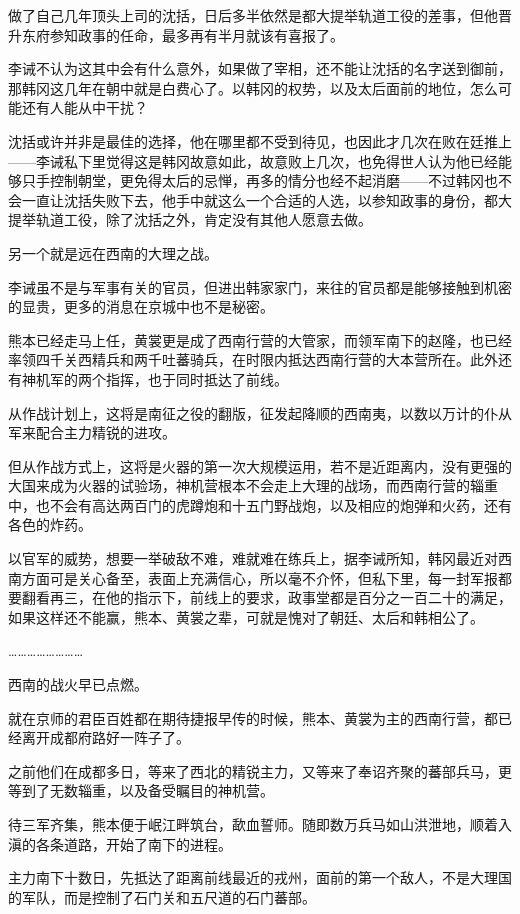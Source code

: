 做了自己几年顶头上司的沈括，日后多半依然是都大提举轨道工役的差事，但他晋升东府参知政事的任命，最多再有半月就该有喜报了。

李诫不认为这其中会有什么意外，如果做了宰相，还不能让沈括的名字送到御前，那韩冈这几年在朝中就是白费心了。以韩冈的权势，以及太后面前的地位，怎么可能还有人能从中干扰？

沈括或许并非是最佳的选择，他在哪里都不受到待见，也因此才几次在败在廷推上——李诫私下里觉得这是韩冈故意如此，故意败上几次，也免得世人认为他已经能够只手控制朝堂，更免得太后的忌惮，再多的情分也经不起消磨——不过韩冈也不会一直让沈括失败下去，他手中就这么一个合适的人选，以参知政事的身份，都大提举轨道工役，除了沈括之外，肯定没有其他人愿意去做。

另一个就是远在西南的大理之战。

李诫虽不是与军事有关的官员，但进出韩家家门，来往的官员都是能够接触到机密的显贵，更多的消息在京城中也不是秘密。

熊本已经走马上任，黄裳更是成了西南行营的大管家，而领军南下的赵隆，也已经率领四千关西精兵和两千吐蕃骑兵，在时限内抵达西南行营的大本营所在。此外还有神机军的两个指挥，也于同时抵达了前线。

从作战计划上，这将是南征之役的翻版，征发起降顺的西南夷，以数以万计的仆从军来配合主力精锐的进攻。

但从作战方式上，这将是火器的第一次大规模运用，若不是近距离内，没有更强的大国来成为火器的试验场，神机营根本不会走上大理的战场，而西南行营的辎重中，也不会有高达两百门的虎蹲炮和十五门野战炮，以及相应的炮弹和火药，还有各色的炸药。

以官军的威势，想要一举破敌不难，难就难在练兵上，据李诫所知，韩冈最近对西南方面可是关心备至，表面上充满信心，所以毫不介怀，但私下里，每一封军报都要翻看再三，在他的指示下，前线上的要求，政事堂都是百分之一百二十的满足，如果这样还不能赢，熊本、黄裳之辈，可就是愧对了朝廷、太后和韩相公了。

……………………

西南的战火早已点燃。

就在京师的君臣百姓都在期待捷报早传的时候，熊本、黄裳为主的西南行营，都已经离开成都府路好一阵子了。

之前他们在成都多日，等来了西北的精锐主力，又等来了奉诏齐聚的蕃部兵马，更等到了无数辎重，以及备受瞩目的神机营。

待三军齐集，熊本便于岷江畔筑台，歃血誓师。随即数万兵马如山洪泄地，顺着入滇的各条道路，开始了南下的进程。

主力南下十数日，先抵达了距离前线最近的戎州，面前的第一个敌人，不是大理国的军队，而是控制了石门关和五尺道的石门蕃部。

